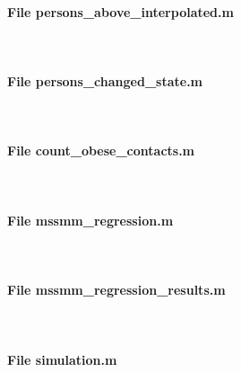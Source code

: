 \documentclass[11pt]{article}
\begin{document}
\paragraph{File persons\_above\_interpolated.m} \


\paragraph{File persons\_changed\_state.m} \


\paragraph{File count\_obese\_contacts.m} \


\paragraph{File mssmm\_regression.m} \


\paragraph{File mssmm\_regression\_results.m} \


\paragraph{File simulation.m} \

\end{document}
